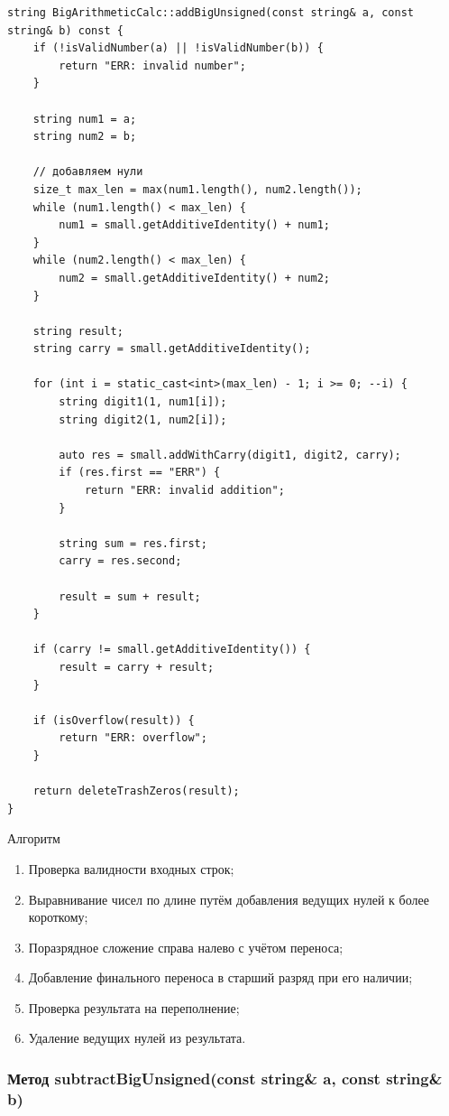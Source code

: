 \begin{lstlisting}[style=cstyle, caption={Реализация addBigUnsigned()}]
string BigArithmeticCalc::addBigUnsigned(const string& a, const string& b) const { 
    if (!isValidNumber(a) || !isValidNumber(b)) {
        return "ERR: invalid number";
    }
    
    string num1 = a;
    string num2 = b;

    // добавляем нули
    size_t max_len = max(num1.length(), num2.length());
    while (num1.length() < max_len) {
        num1 = small.getAdditiveIdentity() + num1;
    }
    while (num2.length() < max_len) {
        num2 = small.getAdditiveIdentity() + num2;
    }

    string result;
    string carry = small.getAdditiveIdentity();

    for (int i = static_cast<int>(max_len) - 1; i >= 0; --i) {
        string digit1(1, num1[i]);
        string digit2(1, num2[i]);

        auto res = small.addWithCarry(digit1, digit2, carry);
        if (res.first == "ERR") {
            return "ERR: invalid addition";
        }
        
        string sum = res.first;
        carry = res.second;
        
        result = sum + result;
    }

    if (carry != small.getAdditiveIdentity()) {
        result = carry + result;
    }

    if (isOverflow(result)) {
        return "ERR: overflow";
    }

    return deleteTrashZeros(result);
}
\end{lstlisting}

Алгоритм \begin{enumerate}
\item Проверка валидности входных строк;
\item Выравнивание чисел по длине путём добавления ведущих нулей к более короткому;
\item Поразрядное сложение справа налево с учётом переноса;
\item Добавление финального переноса в старший разряд при его наличии;
\item Проверка результата на переполнение;
\item Удаление ведущих нулей из результата.
\end{enumerate}

\subsubsection{Метод subtractBigUnsigned(const string\& a, const string\& b)}

